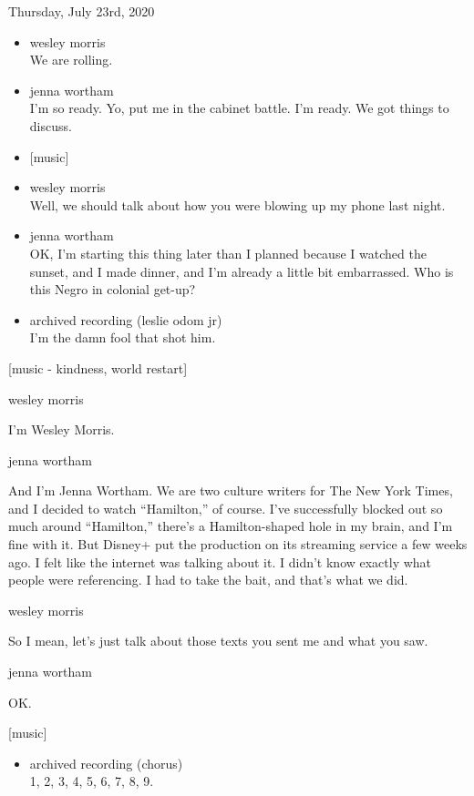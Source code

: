 Thursday, July 23rd, 2020

\begin{itemize}
\item
  wesley morris\\
  We are rolling.
\item
  jenna wortham\\
  I'm so ready. Yo, put me in the cabinet battle. I'm ready. We got
  things to discuss.
\item
  {[}music{]}
\item
  wesley morris\\
  Well, we should talk about how you were blowing up my phone last
  night.
\item
  jenna wortham\\
  OK, I'm starting this thing later than I planned because I watched the
  sunset, and I made dinner, and I'm already a little bit embarrassed.
  Who is this Negro in colonial get-up?
\item
  archived recording (leslie odom jr)\\
  I'm the damn fool that shot him.
\end{itemize}

{[}music - kindness, world restart{]}

wesley morris

I'm Wesley Morris.

jenna wortham

And I'm Jenna Wortham. We are two culture writers for The New York
Times, and I decided to watch ``Hamilton,'' of course. I've successfully
blocked out so much around ``Hamilton,'' there's a Hamilton-shaped hole
in my brain, and I'm fine with it. But Disney+ put the production on its
streaming service a few weeks ago. I felt like the internet was talking
about it. I didn't know exactly what people were referencing. I had to
take the bait, and that's what we did.

wesley morris

So I mean, let's just talk about those texts you sent me and what you
saw.

jenna wortham

OK.

{[}music{]}

\begin{itemize}
\tightlist
\item
  archived recording (chorus)\\
  1, 2, 3, 4, 5, 6, 7, 8, 9.
\end{itemize}

